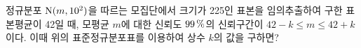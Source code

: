 \noindent\begin{minipage}[t]{0.58\linewidth}\vspace{0pt}\raggedright 정규분포 $\mathrm{N}(m{,}\mkern3mu\mathopen{}10^2)$을 따르는 모집단에서 크기가 225인 표본을 임의추출하여 구한 표본평균이 42일 때, 모평균 $m$에 대한 신뢰도 $99\mkern3mu \%$의 신뢰구간이 $42-k\le m\le 42+k$이다. 이때 위의 표준정규분포표를 이용하여 상수 $k$의 값을 구하면?\end{minipage}\hfill\begin{minipage}[t]{0.4\linewidth}\vspace{0pt}\centering \resizebox{\ifdim\width>\linewidth\linewidth\else\width\fi}{!}{}\end{minipage}\par
{}
